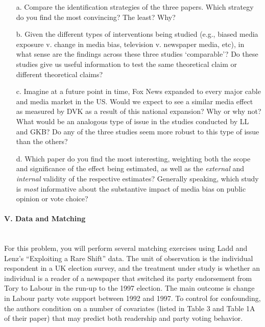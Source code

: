\documentclass{article}
\begin{document}
   \begin{itemize}
   \item[a.]  Compare the identification strategies of the
     three papers.  Which strategy do you find the most convincing?
     The least?  Why?

   \item[b.] Given the different types of interventions being studied
     (e.g., biased media exposure v. change in media bias, television v. newspaper media,
     etc), in what sense are the findings across these three studies
     `comparable'?  Do these studies give us useful information to
     test the same theoretical claim or different theoretical claims?  

   \item[c.] Imagine at a future point in time, Fox News expanded to
    every major cable and media market in the US. Would we 
     expect to see a similar media effect as measured by DVK as a
     result of this national expansion?  Why or why
    not?  What would be an analogous type of issue in the studies
    conducted by LL and GKB?  Do any of the three studies seem more
    robust to this type of issue than the others?

   \item[d.]  Which paper do you find the most 
     interesting, weighting both the scope and significance of the
     effect being estimated, as well as the {\em external} and {\em internal} validity
     of the respective estimates?  Generally speaking, which study is
     {\em most} informative about the substantive impact of media bias on 
public opinion or vote choice?  


\end{itemize}




\paragraph{\Large V. Data and Matching \\ \\}

For this problem, you will perform several matching exercises using
Ladd and Lenz's ``Exploiting a Rare Shift'' data.  The unit of
observation is the individual respondent in a UK election survey, and
the treatment under study is whether an individual is a reader of a
newspaper that switched its party endorsement from Tory to Labour in
the run-up to the 1997 election.  The main outcome is change in Labour
party vote support between 1992 and 1997.  To control for confounding,
the authors condition on a number of covariates (listed in Table 3
and Table 1A of their paper) that may predict both readership and party voting
behavior.
\\
\end{document}
